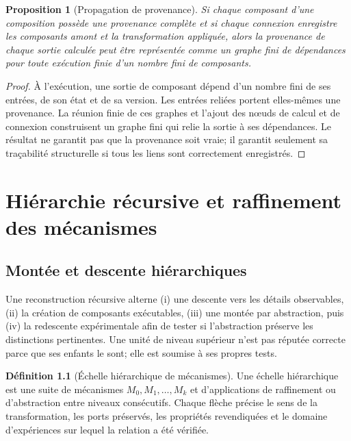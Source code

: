 \documentclass[11pt,oneside]{book}
\newtheorem{proposition}[theoreme]{Proposition}
\theoremstyle{definition}
\newtheorem{definition}[theoreme]{Définition}
\theoremstyle{remark}
\newcommand{\1}{\mathbf 1}
\begin{document}
\begin{proposition}[Propagation de provenance]
Si chaque composant d'une composition possède une provenance complète et si chaque connexion enregistre les composants amont et la transformation appliquée, alors la provenance de chaque sortie calculée peut être représentée comme un graphe fini de dépendances pour toute exécution finie d'un nombre fini de composants.
\end{proposition}
\begin{proof}
À l'exécution, une sortie de composant dépend d'un nombre fini de ses entrées, de son état et de sa version. Les entrées reliées portent elles-mêmes une provenance. La réunion finie de ces graphes et l'ajout des nœuds de calcul et de connexion construisent un graphe fini qui relie la sortie à ses dépendances. Le résultat ne garantit pas que la provenance soit vraie; il garantit seulement sa traçabilité structurelle si tous les liens sont correctement enregistrés.\end{proof}

\chapter{Hiérarchie récursive et raffinement des mécanismes}
\section{Montée et descente hiérarchiques}
Une reconstruction récursive alterne (i) une descente vers les détails observables, (ii) la création de composants exécutables, (iii) une montée par abstraction, puis (iv) la redescente expérimentale afin de tester si l'abstraction préserve les distinctions pertinentes. Une unité de niveau supérieur n'est pas réputée correcte parce que ses enfants le sont; elle est soumise à ses propres tests.

\begin{definition}[Échelle hiérarchique de mécanismes]
Une échelle hiérarchique est une suite de mécanismes $M_0,M_1,\ldots,M_k$ et d'applications de raffinement ou d'abstraction entre niveaux consécutifs. Chaque flèche précise le sens de la transformation, les ports préservés, les propriétés revendiquées et le domaine d'expériences sur lequel la relation a été vérifiée.
\end{definition}
\end{document}
